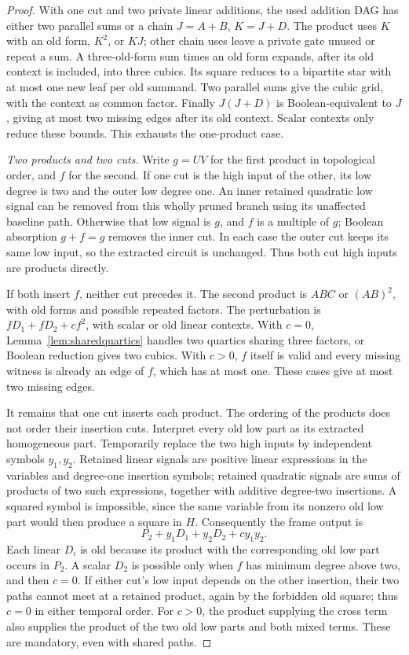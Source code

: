 \documentclass[11pt]{article}
\theoremstyle{definition}
\theoremstyle{remark}
\begin{document}
\begin{proof}
With one cut and two private linear additions, the used addition DAG has either two parallel sums or a chain $J=A+B$, $K=J+D$. The product uses $K$ with an old form, $K^2$, or $KJ$; other chain uses leave a private gate unused or repeat a sum. A three-old-form sum times an old form expands, after its old context is included, into three cubics. Its square reduces to a bipartite star with at most one new leaf per old summand. Two parallel sums give the cubic grid, with the context as common factor. Finally $J(J+D)$ is Boolean-equivalent to $J$, giving at most two missing edges after its old context. Scalar contexts only reduce these bounds. This exhausts the one-product case.

\emph{Two products and two cuts.} Write $g=UV$ for the first product in topological order, and $f$ for the second. If one cut is the high input of the other, its low degree is two and the outer low degree one. An inner retained quadratic low signal can be removed from this wholly pruned branch using its unaffected baseline path. Otherwise that low signal is $g$, and $f$ is a multiple of $g$; Boolean absorption $g+f=g$ removes the inner cut. In each case the outer cut keeps its same low input, so the extracted circuit is unchanged. Thus both cut high inputs are products directly.

If both insert $f$, neither cut precedes it. The second product is $ABC$ or $(AB)^2$, with old forms and possible repeated factors. The perturbation is $fD_1+fD_2+c f^2$, with scalar or old linear contexts. With $c=0$, Lemma~\ref{lem:sharedquartics} handles two quartics sharing three factors, or Boolean reduction gives two cubics. With $c>0$, $f$ itself is valid and every missing witness is already an edge of $f$, which has at most one. These cases give at most two missing edges.

It remains that one cut inserts each product. The ordering of the products does not order their insertion cuts. Interpret every old low part as its extracted homogeneous part. Temporarily replace the two high inputs by independent symbols $y_1,y_2$. Retained linear signals are positive linear expressions in the variables and degree-one insertion symbols; retained quadratic signals are sums of products of two such expressions, together with additive degree-two insertions. A squared symbol is impossible, since the same variable from its nonzero old low part would then produce a square in $H$. Consequently the frame output is
\[
 P_2+y_1D_1+y_2D_2+c y_1y_2.
\]
Each linear $D_i$ is old because its product with the corresponding old low part occurs in $P_2$. A scalar $D_2$ is possible only when $f$ has minimum degree above two, and then $c=0$. If either cut's low input depends on the other insertion, their two paths cannot meet at a retained product, again by the forbidden old square; thus $c=0$ in either temporal order. For $c>0$, the product supplying the cross term also supplies the product of the two old low parts and both mixed terms. These are mandatory, even with shared paths.


\end{proof}
\end{document}
